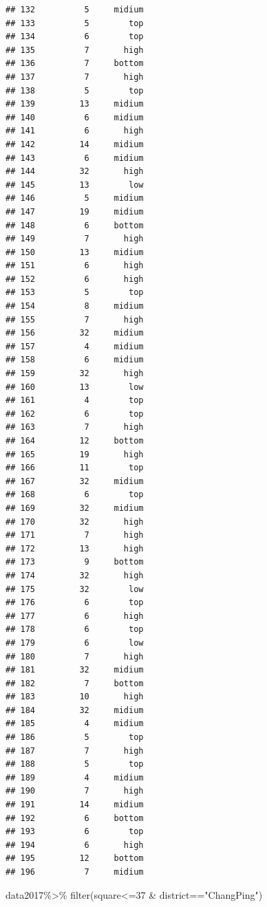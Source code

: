 \documentclass[
]{article}
\newenvironment{Shaded}{\begin{snugshade}}{\end{snugshade}}
\newcommand{\DecValTok}[1]{\textcolor[rgb]{0.00,0.00,0.81}{#1}}
\newcommand{\FunctionTok}[1]{\textcolor[rgb]{0.00,0.00,0.00}{#1}}
\newcommand{\NormalTok}[1]{#1}
\newcommand{\SpecialCharTok}[1]{\textcolor[rgb]{0.00,0.00,0.00}{#1}}
\newcommand{\StringTok}[1]{\textcolor[rgb]{0.31,0.60,0.02}{#1}}
\begin{document}
\begin{verbatim}
## 132          5     midium
## 133          5        top
## 134          6        top
## 135          7       high
## 136          7     bottom
## 137          7       high
## 138          5        top
## 139         13     midium
## 140          6     midium
## 141          6       high
## 142         14     midium
## 143          6     midium
## 144         32       high
## 145         13        low
## 146          5     midium
## 147         19     midium
## 148          6     bottom
## 149          7       high
## 150         13     midium
## 151          6       high
## 152          6       high
## 153          5        top
## 154          8     midium
## 155          7       high
## 156         32     midium
## 157          4     midium
## 158          6     midium
## 159         32       high
## 160         13        low
## 161          4        top
## 162          6        top
## 163          7       high
## 164         12     bottom
## 165         19       high
## 166         11        top
## 167         32     midium
## 168          6        top
## 169         32     midium
## 170         32       high
## 171          7       high
## 172         13       high
## 173          9     bottom
## 174         32       high
## 175         32        low
## 176          6        top
## 177          6       high
## 178          6        top
## 179          6        low
## 180          7       high
## 181         32     midium
## 182          7     bottom
## 183         10       high
## 184         32     midium
## 185          4     midium
## 186          5        top
## 187          7       high
## 188          5        top
## 189          4     midium
## 190          7       high
## 191         14     midium
## 192          6     bottom
## 193          6        top
## 194          6       high
## 195         12     bottom
## 196          7     midium
\end{verbatim}

\begin{Shaded}
\begin{Highlighting}[]
\NormalTok{data2017}\SpecialCharTok{\%\textgreater{}\%}
  \FunctionTok{filter}\NormalTok{(square}\SpecialCharTok{\textless{}=}\DecValTok{37} \SpecialCharTok{\&}\NormalTok{ district}\SpecialCharTok{==}\StringTok{"ChangPing"}\NormalTok{)}
\end{Highlighting}
\end{Shaded}
\end{document}
